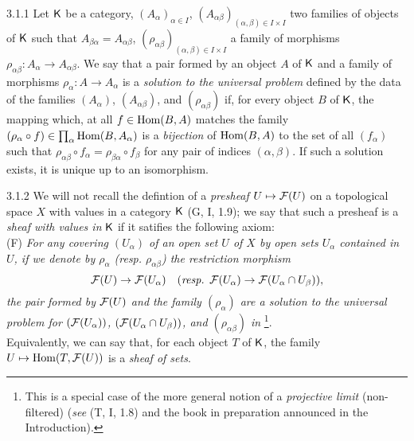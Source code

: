 
\begin{env}{3.1.1}
\label{env-0.3.1.1}
Let $\mathsf{K}$ be a category, $(A_\alpha)_{\alpha\in I}$,
$(A_{\alpha\beta})_{(\alpha,\beta)\in I\times I}$ two families of objects
of $\mathsf{K}$ such that $A_{\beta\alpha}=A_{\alpha\beta}$,
$(\rho_{\alpha\beta})_{(\alpha,\beta)\in I\times I}$ a family of morphisms
$\rho_{\alpha\beta}\colon A_\alpha\to A_{\alpha\beta}$. We say that a pair formed by
an object $A$ of $\mathsf{K}$ and a family of morphisms $\rho_\alpha\colon A\to A_\alpha$ 
is a \emph{solution to the universal problem} defined by the data of the families
$(A_\alpha)$, $(A_{\alpha\beta})$, and $(\rho_{\alpha\beta})$ if, for every object $B$
of $\mathsf{K}$, the mapping which, at all $f\in\operatorname{Hom}(B,A)$ matches the
family $(\rho_\alpha\circ f)\in\prod_\alpha\operatorname{Hom}(B,A_\alpha)$ is a \emph{bijection}
of $\operatorname{Hom}(B,A)$ to the set of all $(f_\alpha)$ such that
$\rho_{\alpha\beta}\circ f_\alpha=\rho_{\beta\alpha}\circ f_\beta$ for any pair of
indices $(\alpha,\beta)$. If such a solution exists, it is unique up to an isomorphism.
\end{env}

\begin{env}{3.1.2}
\label{env-0.3.1.2}
We will not recall the defintion of a \emph{presheaf} $U\mapsto\mathcal{F}(U)$ on a
topological space $X$ with values in a category $\mathsf{K}$ (G, I, 1.9); we say that
such a presheaf is a \emph{sheaf with values in} $\mathsf{K}$ if it satifies the following
axiom:\\

(F) \emph{For any covering $(U_\alpha)$ of an open set $U$ of $X$ by open sets
   $U_\alpha$ contained in $U$, if we denote by $\rho_\alpha$ (resp. $\rho_{\alpha\beta}$) the
   restriction morphism}
   \[
     \mathcal{F}(U)\to\mathcal{F}(U_\alpha)\quad(\text{\emph{resp. }}\mathcal{F}(U_\alpha)\to\mathcal{F}(U_\alpha\cap U_\beta)),
   \]
   \emph{the pair formed by $\mathcal{F}(U)$ and the family $(\rho_\alpha)$ are a solution to
   the universal problem for $(\mathcal{F}(U_\alpha))$, $(\mathcal{F}(U_\alpha\cap U_\beta))$, and $(\rho_{\alpha\beta})$
   in} \footnote{This is a special case of the more general notion of a
   \emph{projective limit} (non-filtered) (\emph{see} (T, I, 1.8) and the book in
   preparation announced in the Introduction).}.\\

Equivalently, we can say that, for each object $T$ of $\mathsf{K}$, the family
$U\mapsto\operatorname{Hom}(T,\mathcal{F}(U))$ is a \emph{sheaf of sets}.
\end{env}

